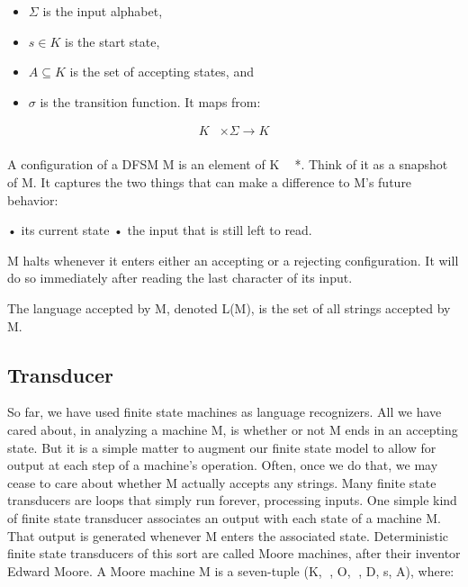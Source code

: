 \documentclass{article}
\begin{document}
\begin{itemize} \item $\Sigma$ is the input alphabet, \item $s \in K$ is the
start state, \item $A \subseteq K$ is the set of accepting states, and \item
$\sigma$ is the transition function. It maps from: \end{itemize}

\begin{align*} K &\times \Sigma \to K \\ \end{align*}

A configuration of a DFSM M is an element of K  *. Think of it as a snapshot
of M. It captures the two things that can make a difference to M’s future
behavior:

• its current state • the input that is still left to read.

M halts whenever it enters either an accepting or a rejecting configuration. It
will do so immediately after reading the last character of its input.

The language accepted by M, denoted L(M), is the set of all strings accepted by
M.

\subsection{}


\subsection{Transducer}


So far, we have used finite state machines as language recognizers. All we have cared about, in analyzing a machine
M, is whether or not M ends in an accepting state. But it is a simple matter to augment our finite state model to allow
for output at each step of a machine’s operation. Often, once we do that, we may cease to care about whether M
actually accepts any strings. Many finite state transducers are loops that simply run forever, processing inputs.
One simple kind of finite state transducer associates an output with each state of a machine M. That output is generated
whenever M enters the associated state. Deterministic finite state transducers of this sort are called Moore machines,
after their inventor Edward Moore. A Moore machine M is a seven-tuple (K, , O, , D, s, A), where:
\end{document}
